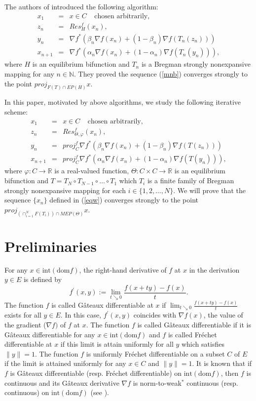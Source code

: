 \documentclass[reqno,b5paper]{amsart}
\theoremstyle{plain}
\theoremstyle{definition}
\numberwithin{equation}{section}
\numberwithin{equation}{section}
\begin{document}
The authors of \cite{kum} introduced the following algorithm:
\begin{eqnarray}
x_{1}&=&x\in C \ \ \ \ \  \text{chosen arbitrarily},\nonumber\\
z_{n}&=&Res_{H}^{f}(x_{n}),\nonumber\\
y_{n}&=&\nabla f^{*}(\beta_{n}\nabla f(x_{n})+(1-\beta_{n})\nabla f(T_{n}(z_{n})))\nonumber\\
x_{n+1}&=&\nabla f^{*}(\alpha_{n}\nabla f(x_{n})+(1-\alpha_{n})\nabla f(T_{n}(y_{n}))),\label{mnb}
\end{eqnarray}
where $H$ is an equilibrium bifunction and $T_{n}$ is a Bregman strongly nonexpansive mapping for any  $n\in \mathbb{N}$. They proved the sequence (\ref{mnb})  converges strongly to the point $proj_{F(T)\cap EP(H)}x$.

In this paper, motivated by above algorithms, we study  the following iterative scheme:
\begin{eqnarray}
x_{1}&=&x\in C \ \ \ \ \  \text{chosen arbitrarily},\nonumber\\
z_{n}&=&Res_{\Theta,\varphi}^{f}(x_{n}),\nonumber\\
y_{n}&=&proj_{C}^{f}\nabla f^{*}(\beta_{n}\nabla f(x_{n})+(1-\beta_{n})\nabla f(T(z_{n})))\nonumber\\
x_{n+1}&=&proj_{C}^{f}\nabla f^{*}(\alpha_{n}\nabla f(x_{n})+(1-\alpha_{n})\nabla f (T(y_{n}))),\label{eqw}
\end{eqnarray}
where $\varphi :C\to \mathbb{R}$ is a real-valued function,  $\Theta: C\times C\to \mathbb{R}$ is an equilibrium bifunction and $T=T_{N}\circ T_{N-1}\circ \ldots\circ T_{1}$ which $T_{i}$ is a finite family of Bregman strongly nonexpansive mapping for each $i\in \{1,2,\ldots, N\}$. 
We will prove that the sequence $\{x_{n}\}$ defined in (\ref{eqw}) converges strongly to the point $proj_{(\cap_{i=1}^{N}F(T_{i}))\cap MEP(\Theta)}x$.
\section{Preliminaries}
For any $x\in \text{int}(\text{dom} f)$, the right-hand derivative of $f$ at $x$ in the derivation $y\in E$ is defined by
$$f^{'}(x,y):=\lim _{t\searrow0} \frac{f(x+ty)-f(x)}{t}.$$
The function $f$ is called G\^{a}teaux differentiable at $x$ if $\lim_{t\searrow0} \frac{f(x+ty)-f(x)}{t}$ exists for all $y\in E$. In this case, $f^{'}(x,y)$ coincides with $\nabla f(x)$, the value of the gradient ($\nabla f)$ of $f$ at $x$. The function $f$ is called G\^{a}teaux differentiable if it is G\^{a}teaux differentiable for any $x\in \text{int}(\text{dom} f)$ and $f$ is called Fr\'{e}chet differentiable at $x$ if this limit is attain uniformly for all $y$ which satisfies $\|y\|=1$. The function $f$ is uniformly Fr\'{e}chet differentiable on a subset $C$ of $E$ if the limit is attained uniformly for any $x\in C$ and $\|y\|=1$. It is known that if $f$ is G\^{a}teaux differentiable (resp. Fr\'{e}chet differentiable) on $\text{int}(\text{dom} f)$, then $f$ is continuous and its G\^{a}teaux derivative $\nabla f$ is norm-to-weak$^*$ continuous (resp. continuous) on $\text{int} (\text{dom}f)$ (see \cite{bon}).
\end{document}
